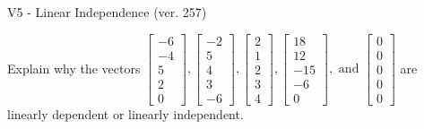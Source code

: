 \begin{exercise}
  \begin{exerciseTitle}V5 - Linear Independence (ver. 257)\end{exerciseTitle}
  \begin{exerciseStatement}
    Explain why the vectors \(\left[\begin{array}{r}
-6 \\
-4 \\
5 \\
2 \\
0
\end{array}\right] , \left[\begin{array}{r}
-2 \\
5 \\
4 \\
3 \\
-6
\end{array}\right] , \left[\begin{array}{r}
2 \\
1 \\
2 \\
3 \\
4
\end{array}\right] , \left[\begin{array}{r}
18 \\
12 \\
-15 \\
-6 \\
0
\end{array}\right] , \text{ and } \left[\begin{array}{r}
0 \\
0 \\
0 \\
0 \\
0
\end{array}\right]\) are linearly dependent or linearly independent.	



\end{exerciseStatement}
\end{exercise}

